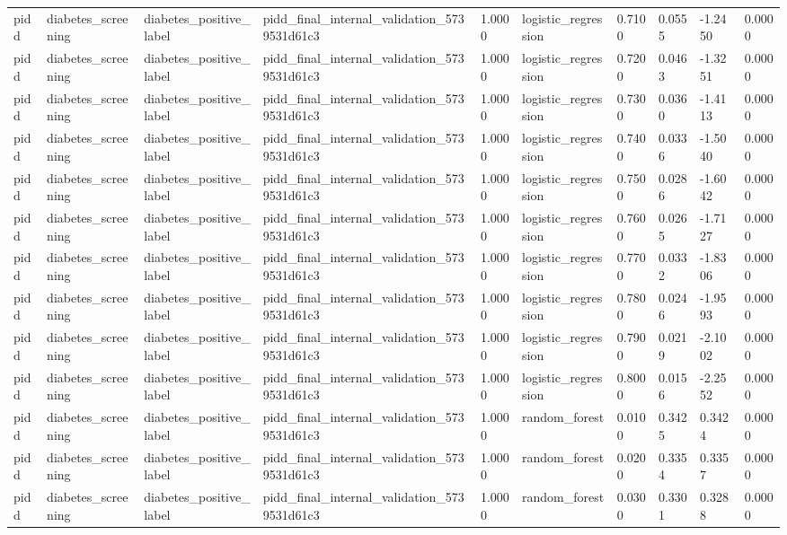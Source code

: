 \begin{tabular}{llllllllll}
pidd & diabetes\_screening & diabetes\_positive\_label & pidd\_final\_internal\_validation\_5739531d61c3 & 1.0000 & logistic\_regression & 0.7100 & 0.0555 & -1.2450 & 0.0000 \\
pidd & diabetes\_screening & diabetes\_positive\_label & pidd\_final\_internal\_validation\_5739531d61c3 & 1.0000 & logistic\_regression & 0.7200 & 0.0463 & -1.3251 & 0.0000 \\
pidd & diabetes\_screening & diabetes\_positive\_label & pidd\_final\_internal\_validation\_5739531d61c3 & 1.0000 & logistic\_regression & 0.7300 & 0.0360 & -1.4113 & 0.0000 \\
pidd & diabetes\_screening & diabetes\_positive\_label & pidd\_final\_internal\_validation\_5739531d61c3 & 1.0000 & logistic\_regression & 0.7400 & 0.0336 & -1.5040 & 0.0000 \\
pidd & diabetes\_screening & diabetes\_positive\_label & pidd\_final\_internal\_validation\_5739531d61c3 & 1.0000 & logistic\_regression & 0.7500 & 0.0286 & -1.6042 & 0.0000 \\
pidd & diabetes\_screening & diabetes\_positive\_label & pidd\_final\_internal\_validation\_5739531d61c3 & 1.0000 & logistic\_regression & 0.7600 & 0.0265 & -1.7127 & 0.0000 \\
pidd & diabetes\_screening & diabetes\_positive\_label & pidd\_final\_internal\_validation\_5739531d61c3 & 1.0000 & logistic\_regression & 0.7700 & 0.0332 & -1.8306 & 0.0000 \\
pidd & diabetes\_screening & diabetes\_positive\_label & pidd\_final\_internal\_validation\_5739531d61c3 & 1.0000 & logistic\_regression & 0.7800 & 0.0246 & -1.9593 & 0.0000 \\
pidd & diabetes\_screening & diabetes\_positive\_label & pidd\_final\_internal\_validation\_5739531d61c3 & 1.0000 & logistic\_regression & 0.7900 & 0.0219 & -2.1002 & 0.0000 \\
pidd & diabetes\_screening & diabetes\_positive\_label & pidd\_final\_internal\_validation\_5739531d61c3 & 1.0000 & logistic\_regression & 0.8000 & 0.0156 & -2.2552 & 0.0000 \\
pidd & diabetes\_screening & diabetes\_positive\_label & pidd\_final\_internal\_validation\_5739531d61c3 & 1.0000 & random\_forest & 0.0100 & 0.3425 & 0.3424 & 0.0000 \\
pidd & diabetes\_screening & diabetes\_positive\_label & pidd\_final\_internal\_validation\_5739531d61c3 & 1.0000 & random\_forest & 0.0200 & 0.3354 & 0.3357 & 0.0000 \\
pidd & diabetes\_screening & diabetes\_positive\_label & pidd\_final\_internal\_validation\_5739531d61c3 & 1.0000 & random\_forest & 0.0300 & 0.3301 & 0.3288 & 0.0000 \\

\end{tabular}
